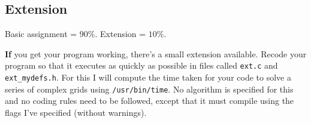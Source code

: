 \begin{exercise}
\subsection*{Extension}

Basic assignment = {\Large $90\%$}.
Extension = {\Large $10\%$}.

\noindent
{\bf If} you get your program working, there's a small extension available.
Recode your program so that it executes as quickly as possible in files
called \verb^ext.c^ and \verb^ext_mydefs.h^.
For this I will compute the time taken for your code to solve
a series of complex grids using \verb^/usr/bin/time^.
No algorithm is specified for this and no coding rules need to be followed,  
except that it must compile using the flags I've specified (without warnings).
\end{exercise}
